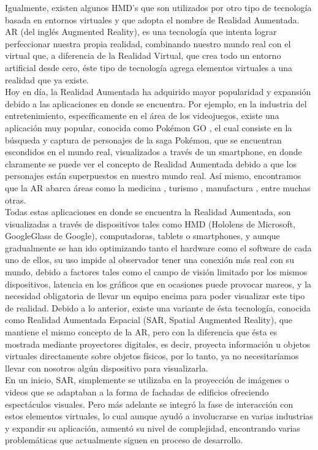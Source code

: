 \documentclass[a4paper,openright,12pt]{report}
\begin{document}
Igualmente, existen algunos HMD’s que son utilizados por otro tipo de tecnología basada en entornos virtuales y que adopta el nombre de Realidad Aumentada.\\
AR (del inglés Augmented Reality), es una tecnología que intenta lograr perfeccionar nuestra propia realidad, combinando nuestro mundo real con el virtual que, a diferencia de la Realidad Virtual, que crea todo un entorno artificial desde cero, éste tipo de tecnología agrega elementos virtuales a una realidad que ya existe.\\
Hoy en día, la Realidad Aumentada ha adquirido mayor popularidad y expansión debido a las aplicaciones en donde se encuentra. Por ejemplo, en la industria del entretenimiento, específicamente en el área de los videojuegos, existe una aplicación muy popular, conocida como Pokémon GO \cite{Dorward2017}, el cual consiste en la búsqueda y captura de personajes de la saga Pokémon, que se encuentran escondidos en el mundo real, visualizados a través de un smartphone, en donde claramente se puede ver el concepto de Realidad Aumentada debido a que los personajes están superpuestos en nuestro mundo real. Así mismo, encontramos que la AR abarca áreas como la medicina \cite{Marescaux2004,Ploder1995}, turismo \cite{Kounavis2012}, manufactura \cite{Frund2004}, entre muchas otras.\\
Todas estas aplicaciones en donde se encuentra la Realidad Aumentada, son visualizadas a través de dispositivos tales como HMD (Hololens de Microsoft, GoogleGlass de Google), computadoras, tablets o smartphones, y aunque gradualmente se han ido optimizando tanto el hardware como el software de cada uno de ellos, su uso impide al observador tener una conexión más real con su mundo, debido a factores tales como el campo de visión limitado por los mismos dispositivos, latencia en los gráficos que en ocasiones puede provocar mareos, y la necesidad obligatoria de llevar un equipo encima para poder visualizar este tipo de realidad. Debido a lo anterior, existe una variante de ésta tecnología, conocida como Realidad Aumentada Espacial (SAR, Spatial Augmented Reality), que mantiene el mismo concepto de la AR, pero con la diferencia que ésta es mostrada mediante proyectores digitales, es decir, proyecta información u objetos virtuales directamente sobre objetos físicos, por lo tanto, ya no necesitaríamos llevar con nosotros algún dispositivo para visualizarla.\\
En un inicio, SAR, simplemente se utilizaba en la proyección de imágenes o videos que se adaptaban a la forma de fachadas de edificios ofreciendo espectáculos visuales. Pero más adelante se integró la fase de interacción con estos elementos virtuales, lo cual aunque ayudó a involucrarse en varias industrias y expandir su aplicación, aumentó su nivel de complejidad, encontrando varias problemáticas que actualmente siguen en proceso de desarrollo.
\end{document}
